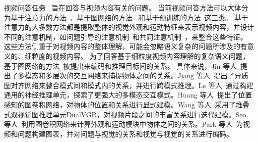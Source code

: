 


视频问答任务~\cite{xu2017video} 旨在回答与视频内容有关的问题。
当前视频问答方法可以大体分为基于注意力的方法~\cite{xu2017video,jiang2020divide,gao2018motion,zha2019spatiotemporal,le2020hierarchical}、基于图网络的方法~\cite{jiang2020reasoning,huang2020location,wang2021dualvgr,seo2021attend,park2021bridge} 和基于预训练的方法~\cite{amrani2021noise,lei2021less,seo2021look,yang2021just}这三类。
基于注意力的大多数方法都是提取整体的视觉外观和运动特征来表示视频内容，并设计不同的注意机制，如问题引导的注意机制~\cite{xu2017video,jiang2020divide}和共同注意机制~\cite{gao2018motion,zha2019spatiotemporal}，来整合这些特征。
这些方法侧重于对视频内容的整体理解，可能会忽略语义复杂的问题所涉及的有意义的、细粒度的视频内容。
为了回答基于细粒度视频内容理解的复杂语义问题，基于图网络的方法~\cite{jin2019multi,jiang2020reasoning,le2020hierarchical,huang2020location,kim2020modality,wang2021dualvgr,seo2021attend,park2021bridge}被提出来编码和推理目标间的关系。
具体来说，Jin 等人~\cite{jin2019multi}提出了多模态和多层次的交互网络来捕捉物体之间的关系。Jiang 等人~\cite{jiang2020reasoning}提出了异质图对齐网络来整合模式间和模式内的关系，并进行跨模式推理。Le 等人~\cite{le2020hierarchical}通过构建通用的神经推理单元，探索了更强大的多模态交互模式。Huang 等人~\cite{huang2020location}提出了位置感知的图卷积网络，对物体的位置和关系进行显式建模。Wang 等人~\cite{wang2021dualvgr}采用了堆叠式双视觉图推理单元DualVGR，对视频片段之间的丰富关系进行迭代建模。Seo 等人~\cite{seo2021attend}利用图卷积网络来计算外观和运动模块中物体之间的关系。Park 等人~\cite{park2021bridge}为视频和问题构建图表，并对问题与视觉的关系和视觉与视觉的关系进行编码。


